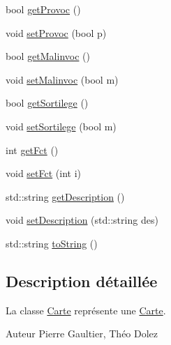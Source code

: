\begin{DoxyCompactItemize}
\item 
bool \hyperlink{class_carte_aeaa95af6ce4e589556b3e0258a1a1fd5}{get\-Provoc} ()
\item 
void \hyperlink{class_carte_a5e107806db0095a43d360eb5aba4f268}{set\-Provoc} (bool p)
\item 
bool \hyperlink{class_carte_a7586f5cb80e50c331b85b52a99b273f1}{get\-Malinvoc} ()
\item 
void \hyperlink{class_carte_a8ae1e50c276ec598c722cc2090aa60bc}{set\-Malinvoc} (bool m)
\item 
bool \hyperlink{class_carte_a787e408176618c033f3ca3f2477d954e}{get\-Sortilege} ()
\item 
void \hyperlink{class_carte_adea41dd43ce6833bc82d515063b211b2}{set\-Sortilege} (bool m)
\item 
int \hyperlink{class_carte_abe483c0dfd894f74a7e70bd09c2f81db}{get\-Fct} ()
\item 
void \hyperlink{class_carte_a2dd4e1213a7c8ac586c899f480565e40}{set\-Fct} (int i)
\item 
std\-::string \hyperlink{class_carte_a71f1d9f42828cd1904d41072c7e1364b}{get\-Description} ()
\item 
void \hyperlink{class_carte_a969792359230516af5306af9c332e4cf}{set\-Description} (std\-::string des)
\item 
std\-::string \hyperlink{class_carte_aa87e41eb0a7e1c296e89a3f8f1bdf98b}{to\-String} ()
\end{DoxyCompactItemize}


\subsection{Description détaillée}
La classe \hyperlink{class_carte}{Carte} représente une \hyperlink{class_carte}{Carte}. \begin{DoxyAuthor}{Auteur}
Pierre Gaultier, Théo Dolez 
\end{DoxyAuthor}


